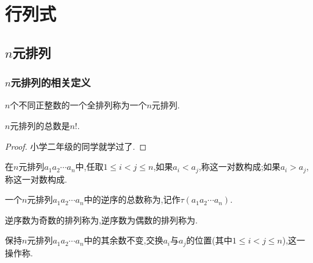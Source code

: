 \documentclass{ctexart}
\begin{document}
\section{行列式}
\subsection{$n$元排列}
\subsubsection{$n$元排列的相关定义}
\begin{definition}[$n$元排列]
    $n$个不同正整数的一个全排列称为一个$n$元排列.
\end{definition}
\begin{lemma}
    $n$元排列的总数是$n!$.
\end{lemma}
\begin{proof}
    小学二年级的同学就学过了.
\end{proof}
\begin{definition}[顺序与逆序]
    在$n$元排列$a_1a_2\cdots a_n$中,任取$1\leqslant i<j\leqslant n$,如果$a_i<a_j$,称这一对数构成;如果$a_i>a_j$,称这一对数构成.
\end{definition}
\begin{definition}[逆序数]
    一个$n$元排列$a_1a_2\cdots a_n$中的逆序的总数称为,记作$\tau\left(a_1a_2\cdots a_n\right)$.
\end{definition}
\begin{definition}[奇排列与偶排列]
    逆序数为奇数的排列称为,逆序数为偶数的排列称为.
\end{definition}
\begin{definition}[对换]
    保持$n$元排列$a_1a_2\cdots a_n$中的其余数不变,交换$a_i$与$a_j$的位置(其中$1\leqslant i<j\leqslant n$),这一操作称.
\end{definition}
\end{document}
